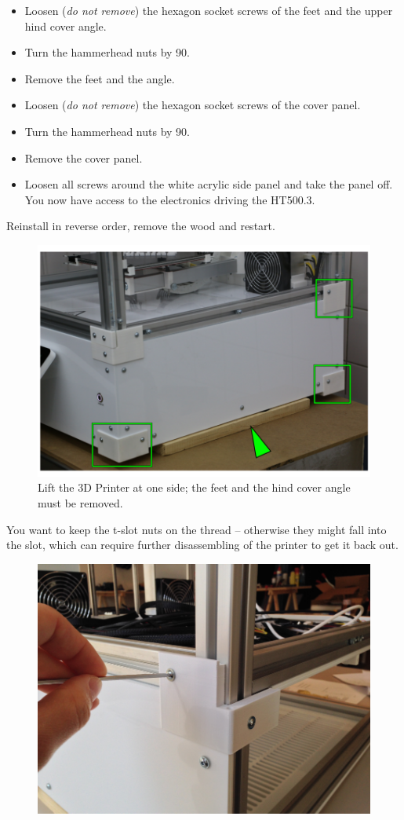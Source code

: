\begin{itemize}
  \item Loosen (\emph{do not remove}) the hexagon socket screws of the feet and the upper hind cover angle.
  \item Turn the hammerhead nuts by 90\degree.
  \item Remove the feet and the angle.
  \item Loosen (\emph{do not remove}) the hexagon socket screws of the cover panel.
  \item Turn the hammerhead nuts by 90\degree.
  \item Remove the cover panel.
  \item Loosen all screws around the white acrylic side panel and take the panel off. 
        You now have access to the electronics driving the HT500.3.
\end{itemize}

Reinstall in reverse order, remove the wood and restart.

\begin{figure}[H]
  \centering
  \includegraphics[width=.7\linewidth]{./img/sg_openechamber_1.png}
  \caption{Lift the 3D Printer at one side; the feet and the hind cover angle must be removed.}
\end{figure}

\begin{info}
  You want to keep the t-slot nuts on the thread – otherwise they might fall into the slot, which can require further disassembling of the printer to get it back out.
\end{info}

\begin{figure}[H]
  \centering
  \includegraphics[width=.7\linewidth]{./img/open_electronics_enclosure_-_step4_-_02.png}
\end{figure}

